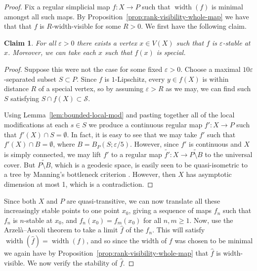 \documentclass[11pt,a4paper]{amsart}
\DeclareMathOperator{\width}{width}
\newtheorem{claim}[theorem]{Claim}
\theoremstyle{definition}
\begin{document}
\begin{proof}
    Fix a regular simplicial map $f : X \to P$ such that $\width(f)$ is minimal amongst all such maps. By Proposition~\ref{prop:rank-visibility-whole-map} we have that that $f$ is $R$-width-visible for some $R > 0$.  We first have the following claim.

    \begin{claim}
        For all $\varepsilon > 0$ there exists a vertex $x \in V(X)$ such that $f$ is $\varepsilon$-stable at $x$. Moreover, we can take each $x$ such that $f(x)$ is special.
    \end{claim}

    \begin{proof}
		Suppose this were not the case for some fixed $\varepsilon > 0$. Choose a maximal $10\varepsilon$-separated subset $S \subset P$. Since $f$ is $1$-Lipschitz, every $y \in f(X)$ is within distance $R$ of a special vertex, so by assuming $\varepsilon > R$ as we may, we can find such $S$ satisfying $S \cap f(X) \subset \mathscr S$.
        
        Using Lemma~\ref{lem:bounded-local-mod} and pasting together all of the local modifications at each $s \in S$ we produce a continuous regular map $f' : X \to P$  such that $f'(X) \cap S = \emptyset$.  In fact, it is easy to see that we may take $f'$ such that $f'(X) \cap B = \emptyset$, where $B = B_P(S;\varepsilon/5)$. However, since $f'$ is continuous and $X$ is simply connected, we may lift $f'$ to a regular map $\widetilde {f'} : X \to \widetilde {P \setminus B}$ to the universal cover. But $\widetilde {P \setminus B}$, which is a geodesic space, is easily seen to be quasi-isometric to a tree by Manning's bottleneck criterion \cite[Thm.~4.6]{manning2005geometry}. However, then $X$ has asymptotic dimension at most 1, which is a contradiction.
    \end{proof}

	Since both $X$ and $P$ are quasi-transitive, we can now translate all these increasingly stable points to one point $x_0$, giving a sequence of maps $f_n$ such that $f_n$ is $n$-stable at $x_0$, and $f_n(x_0) = f_m(x_0)$ for all $n,m \geq 1$. Now, use the Arzel\`a--Ascoli theorem to take a limit $\widehat f$ of the $f_n$. This will satisfy $\width(\widehat f) = \width(f)$, and so since the width of $f$ was chosen to be minimal we again have by Proposition~\ref{prop:rank-visibility-whole-map} that $\widehat f$ is width-visible. 
    We now verify the stability of $\widehat f$.


\end{proof}
\end{document}
